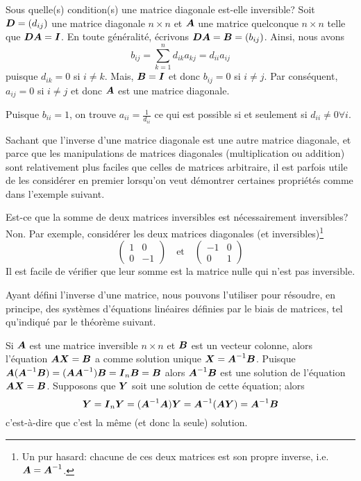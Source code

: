  \begin{exemple}
 Sous quelle(s) condition(s) une matrice diagonale est-elle inversible?
 \solution
 Soit $\boldsymbol{D}=(d_{ij})$ une matrice diagonale $n\times n$ et $\boldsymbol{A}$ une matrice quelconque $n \times n$ telle que $\boldsymbol{D}\boldsymbol{A} = \boldsymbol{I}$.  En toute généralité, écrivons $\boldsymbol{D}\boldsymbol{A} = \boldsymbol{B} = (b_{ij})$.  Ainsi, nous avons
 \[
 b_{ij} = \sum_{k=1}^n d_{ik} a_{kj} = d_{ii} a_{ij}
 \]
 puisque $d_{ik} = 0$ si $i\neq k$.  Mais, $\boldsymbol{B}=\boldsymbol{I}$ et donc $b_{ij} = 0 $ si $i\neq j$.  Par conséquent, $a_{ij}=0$ si $i\neq j$ et donc $\boldsymbol{A}$ est une matrice diagonale.

Puisque $b_{ii} = 1$, on trouve $\displaystyle a_{ii} = \frac{1}{d_{ii}}$ ce qui est possible si et seulement si $d_{ii}\neq 0 \forall i$.

 \end{exemple}
Sachant que l'inverse d'une matrice diagonale est une autre matrice diagonale, 
et parce que les manipulations de matrices diagonales (multiplication ou addition) sont relativement plus faciles 
que celles de matrices arbitraire, il est parfois utile de les considérer en premier lorsqu'on veut démontrer 
certaines propriétés comme dans l'exemple suivant.
\begin{exemple}
Est-ce que la somme de deux matrices inversibles est nécessairement inversibles?
\solution
Non.  Par exemple, considérer les deux matrices diagonales (et inversibles)\footnote{Un pur hasard: chacune de ces deux matrices est son propre inverse, i.e. $\boldsymbol{A} = \boldsymbol{A}^{-1}$.}
\[
\begin{pmatrix}
1 & 0 \\
0 & -1
\end{pmatrix}
\quad\mbox{et}\quad
\begin{pmatrix}
-1 & 0 \\
0 & 1
\end{pmatrix}
\]
Il est facile de vérifier que leur somme est la matrice nulle qui n'est pas inversible.
\end{exemple}

Ayant défini l'inverse d'une matrice, nous pouvons l'utiliser pour résoudre, en principe, des systèmes d'équations linéaires définies par le biais de matrices, tel qu'indiqué par le théorème suivant.

\begin{theo}
Si $\boldsymbol{A}$ est une matrice inversible $n \times n$ et $\boldsymbol{B}$ est un
vecteur colonne, alors l'équation $\boldsymbol{A}\boldsymbol{X}=\boldsymbol{B}$ a comme solution unique $\boldsymbol{X} = \boldsymbol{A}^{-1}\boldsymbol{B}$.
\proof
Puisque $\boldsymbol{A}(\boldsymbol{A}^{-1}\boldsymbol{B}) = (\boldsymbol{A}\boldsymbol{A}^{-1})\boldsymbol{B} = \boldsymbol{I}_n \boldsymbol{B} = \boldsymbol{B}$ alors
$\boldsymbol{A}^{-1}\boldsymbol{B}$ est une solution de l'équation $\boldsymbol{A}\boldsymbol{X}=\boldsymbol{B}$.  Supposons
que $\boldsymbol{Y}$ soit une solution de cette équation; alors 
\[
\boldsymbol{Y} = \boldsymbol{I}_n\boldsymbol{Y} = (\boldsymbol{A}^{-1}\boldsymbol{A})\boldsymbol{Y} = \boldsymbol{A}^{-1}(\boldsymbol{A}\boldsymbol{Y}) = \boldsymbol{A}^{-1} \boldsymbol{B}
\]
c'est-à-dire que c'est la même (et donc la seule) solution.
\end{theo}



